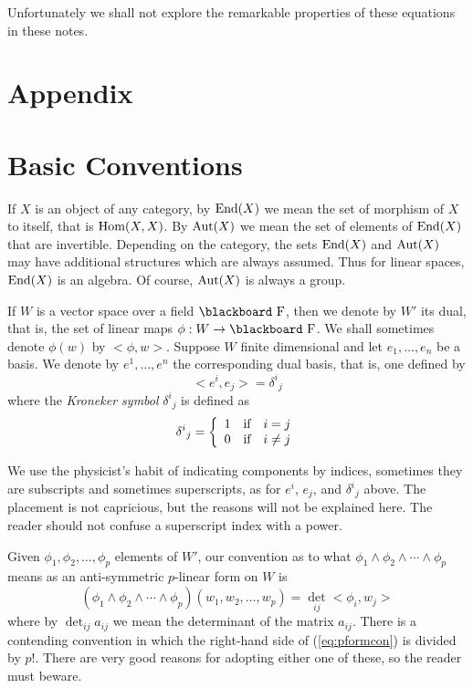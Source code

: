\documentclass[12pt,titlepage]{article}
\def\bbf#1{\hbox{\blackboard #1}}
\def\lF{\bbf F}
\def\Aut{\hbox{Aut}}
\def\End{\hbox{End}}
\def\Hom{\hbox{Hom}}
\begin{document}
Unfortunately we shall not explore the remarkable properties of these
equations in these notes.

\section*{Appendix}%

\appendix

\section{Basic Conventions}\label{sec:bacon}%

If \(X\) is an object of any category, by \(\End(X)\) we mean the set of
morphism of \(X\) to itself, that is \(\Hom(X,X)\). By \(\Aut(X)\) we
mean the set of elements of \(\End(X)\) that are invertible.
Depending on the category, the sets \(\End(X)\) and \(\Aut(X)\) may have
additional structures which are always assumed. Thus for linear spaces,
\(\End(X)\) is an algebra. Of course, \(\Aut(X)\) is always a group. 

If \(W\) is a vector space over a 
field \(\lF\), then we denote by \(W'\)
%
 its dual, that is, the set of
linear maps \(\phi:W\to \lF\). We shall sometimes denote  \(\phi(w)\)
by \(<\phi,w>\). Suppose \(W\) finite dimensional and let 
\(e_1,\dots,e_n\) be a basis. We denote by \(e^1,\dots,e^n\) the
corresponding dual basis,
%
 that is, one defined by
\[
<e^i,e_j> = \delta^i{}_j
\]
where the {\em Kroneker
symbol\/} 
%
\(\delta^i{}_j\) is defined as 
\[
\delta^i{}_j = \left\{\begin{array}{cc} 1 & \hbox{if}\quad i=j \\
0 & \hbox{if}\quad i\neq j\end{array}\right.
\]

We use the physicist's habit of indicating components by indices,
sometimes they are subscripts and sometimes superscripts, as for \(e^i\),
\(e_j\), and  \(\delta^i{}_j\) above. The placement is not capricious,
but the reasons will not be explained here. The reader should not
confuse a superscript index with a power.


Given \(\phi_1,\phi_2,\dots,\phi_p\) elements of \(W'\), 
our convention as to
what \(\phi_1\wedge\phi_2\wedge\cdots\wedge\phi_p\) means as an anti-symmetric
\(p\)-linear form on \(W\) is 
\begin{equation}\label{eq:pformcon}%
(\phi_1\wedge\phi_2\wedge\cdots\wedge\phi_p)(w_1,w_2,\dots,w_p) =
\det_{ij}<\phi_i,w_j>
\end{equation}%
where by \(\det_{ij}a_{ij}\) we mean the determinant of the matrix
\(a_{ij}\). There is a contending convention in which the right-hand side
of (\ref{eq:pformcon}) is divided by \(p!\). There are very good
reasons for adopting either one of these, so the reader must beware.
\end{document}
